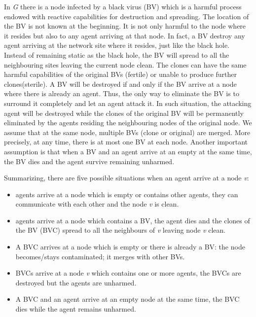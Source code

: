 In {\em G} there is a node infected by a black virus (BV) which is a harmful process endowed with reactive capabilities for destruction and spreading. The location of the BV is not known at the beginning. It is not only harmful to the node where it resides but also to any agent arriving at that node. In fact, a BV destroy any agent arriving at the network site where it resides, just like the black hole. Instead of remaining static as the black hole, the BV will spread to all the neighbouring sites leaving the current node clean. The clones can have the same harmful capabilities of the original BVs (fertile) or unable to produce further clones(sterile). A BV will be destroyed if and only if the BV arrive at a node where there is already an agent. Thus, the only way to eliminate the BV is to surround it completely and let an agent attack it. In such situation, the attacking agent will be destroyed while the clones of the original BV will be permanently eliminated by the agents residing the neighbouring nodes of the original node. We assume that at the same node, multiple BVs (clone or original) are merged. More precisely, at any time, there is at most one BV at each node. 
Another important assumption is that when a BV and an agent arrive at an empty at the same time, the BV dies and the agent survive remaining unharmed.

Summarizing, there are five possible situations when an agent arrive at a node {\em v}:
\begin{itemize}
\item agents arrive at a node which is empty or contains other agents, they can communicate with each other and the node {\em v} is clean.
\item agents arrive at a node which contains a BV, the agent dies and the clones of the BV (BVC) spread to all the neighbours of {\em v} leaving node {\em v} clean.
\item A BVC arrives at a node which is empty or there is already a BV: the node becomes/stays contaminated; it merges with other BVs.
\item BVCs arrive at a node {\em v} which contains one or more agents, the BVCs are destroyed but the agents are unharmed.
\item A BVC and an agent arrive at an empty node at the same time, the BVC dies while the agent remains unharmed. 
\end{itemize}

